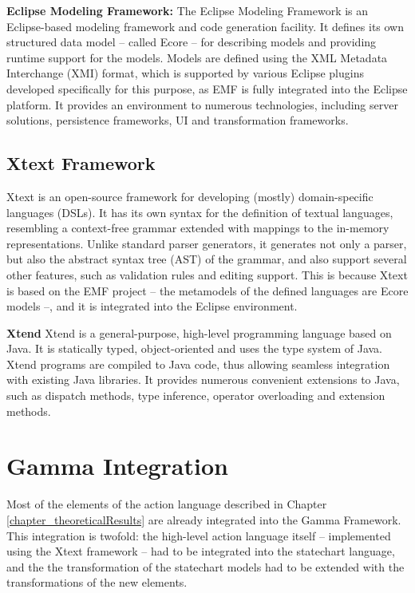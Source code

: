 \textbf{Eclipse Modeling Framework:}
The Eclipse Modeling Framework is an Eclipse-based modeling framework and code generation facility. It defines its own structured data model -- called Ecore -- for describing models and providing runtime support for the models. Models are defined using the XML Metadata Interchange (XMI) format, which is supported by various Eclipse plugins developed specifically for this purpose, as EMF is fully integrated into the Eclipse platform. It provides an environment to numerous technologies, including server solutions, persistence frameworks, UI and transformation frameworks.

\subsection{Xtext Framework}
Xtext is an open-source framework for developing (mostly) domain-specific languages (DSLs). It has its own syntax for the definition of textual languages, resembling a context-free grammar extended with mappings to the in-memory representations. Unlike standard parser generators, it generates not only a parser, but also the abstract syntax tree (AST) of the grammar, and also support several other features, such as validation rules and editing support. This is because Xtext is based on the EMF project -- the metamodels of the defined languages are Ecore models --, and it is integrated into the Eclipse environment.

\textbf{Xtend}
Xtend is a general-purpose, high-level programming language based on Java. It is statically typed, object-oriented and uses the type system of Java. Xtend programs are compiled to Java code, thus allowing seamless integration with existing Java libraries. It provides numerous convenient extensions to Java, such as dispatch methods, type inference, operator overloading and extension methods.

\section{Gamma Integration} \label{section_imp_gamma}
Most of the elements of the action language described in Chapter \ref{chapter_theoreticalResults} are already integrated into the Gamma Framework. This integration is twofold: the high-level action language itself -- implemented using the Xtext framework -- had to be integrated into the statechart language, and the the transformation of the statechart models had to be extended with the transformations of the new elements.

